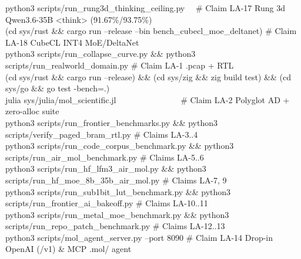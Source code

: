 \documentclass[10pt]{article}
\begin{document}
{{    python3 scripts/run\_rung3d\_thinking\_ceiling.py \ \ \# Claim LA-17 Rung 3d Qwen3.6-35B <think> (91.67\%/93.75\%)\\
    (cd sys/rust \&\& cargo run --release --bin bench\_cubecl\_moe\_deltanet) \# Claim LA-18 CubeCL INT4 MoE/DeltaNet\\
    python3 scripts/run\_collapse\_curve.py \&\& python3 scripts/run\_realworld\_domain.py \# Claim LA-1 .pcap + RTL\\
    (cd sys/rust \&\& cargo run --release) \&\& (cd sys/zig \&\& zig build test) \&\& (cd sys/go \&\& go test -bench=.)\\
    julia sys/julia/mol\_scientific.jl \ \ \ \ \ \ \ \ \ \ \ \ \ \ \ \# Claim LA-2 Polyglot AD + zero-alloc suite\\
    python3 scripts/run\_frontier\_benchmarks.py \&\& python3 scripts/verify\_paged\_bram\_rtl.py \# Claims LA-3..4\\
    python3 scripts/run\_code\_corpus\_benchmark.py \&\& python3 scripts/run\_air\_mol\_benchmark.py \# Claims LA-5..6\\
    python3 scripts/run\_hf\_lfm3\_air\_mol.py \&\& python3 scripts/run\_hf\_moe\_8b\_35b\_air\_mol.py \# Claims LA-7, 9\\
    python3 scripts/run\_sub1bit\_lut\_benchmark.py \&\& python3 scripts/run\_frontier\_ai\_bakeoff.py \# Claims LA-10..11\\
    python3 scripts/run\_metal\_moe\_benchmark.py \&\& python3 scripts/run\_repo\_patch\_benchmark.py \# Claims LA-12..13\\
    python3 scripts/mol\_agent\_server.py --port 8090 \# Claim LA-14 Drop-in OpenAI (/v1) \& MCP .mol/ agent
  }%
}
\end{document}
